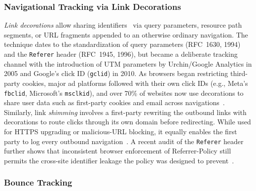 \subsubsection{Navigational Tracking via Link Decorations}
\label{sec:stateful-techniques-link-decorations}

\textit{Link decorations} allow sharing identifiers \symSharing\ via query parameters, resource path segments, or URL fragments appended to an otherwise ordinary navigation.
%
The technique dates to the standardization of query parameters (RFC~1630, 1994) and the \texttt{Referer} header (RFC~1945, 1996), but became a deliberate tracking channel with the introduction of UTM parameters by Urchin/Google Analytics in 2005 and Google's click ID (\texttt{gclid}) in 2010.
%
As browsers began restricting third-party cookies, major ad platforms followed with their own click IDs (e.g., Meta's \texttt{fbclid}, Microsoft's \texttt{msclkid}), and over 70\% of websites now use decorations to share user data such as first-party cookies and email across navigations~\cite{munirPURLSafeEffective2024,koopInDepthEvaluationRedirect2020}.
%
Similarly, link \textit{shimming} involves a first-party rewriting the outbound links with decorations to route clicks through its own domain before redirecting.
%
While used for HTTPS upgrading or malicious-URL blocking, it equally enables the first party to log every outbound navigation~\cite{liShimShimmenyEvaluating2020}.
%
A recent audit of the \texttt{Referer} header further shows that inconsistent browser enforcement of Referrer-Policy still permits the cross-site identifier leakage the policy was designed to prevent~\cite{zagiReferrerPolicyImplementation2025}.


\subsubsection{Bounce Tracking}
\label{sec:stateful-techniques-bounce-tracking}


